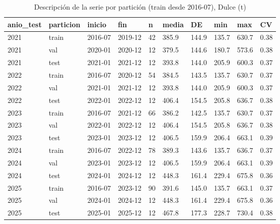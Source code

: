 \begin{table}[H]
\centering
\small
\caption{Descripción de la serie por partición (train desde 2016-07), Dulce (t)}
\label{tab:T03_particiones_dulce}
\begin{tabular}{llllllllll}
\toprule
anio\_test & particion & inicio & fin & n & media & DE & min & max & CV \\
\midrule
2021 & train & 2016-07 & 2019-12 & 42 & 385.9 & 144.9 & 135.7 & 630.7 & 0.38 \\
2021 & val & 2020-01 & 2020-12 & 12 & 379.5 & 144.6 & 180.7 & 573.6 & 0.38 \\
2021 & test & 2021-01 & 2021-12 & 12 & 393.8 & 144.0 & 205.9 & 600.3 & 0.37 \\
2022 & train & 2016-07 & 2020-12 & 54 & 384.5 & 143.5 & 135.7 & 630.7 & 0.37 \\
2022 & val & 2021-01 & 2021-12 & 12 & 393.8 & 144.0 & 205.9 & 600.3 & 0.37 \\
2022 & test & 2022-01 & 2022-12 & 12 & 406.4 & 154.5 & 205.8 & 636.7 & 0.38 \\
2023 & train & 2016-07 & 2021-12 & 66 & 386.2 & 142.5 & 135.7 & 630.7 & 0.37 \\
2023 & val & 2022-01 & 2022-12 & 12 & 406.4 & 154.5 & 205.8 & 636.7 & 0.38 \\
2023 & test & 2023-01 & 2023-12 & 12 & 406.5 & 159.9 & 206.4 & 663.1 & 0.39 \\
2024 & train & 2016-07 & 2022-12 & 78 & 389.3 & 143.6 & 135.7 & 636.7 & 0.37 \\
2024 & val & 2023-01 & 2023-12 & 12 & 406.5 & 159.9 & 206.4 & 663.1 & 0.39 \\
2024 & test & 2024-01 & 2024-12 & 12 & 448.3 & 161.4 & 229.4 & 675.8 & 0.36 \\
2025 & train & 2016-07 & 2023-12 & 90 & 391.6 & 145.0 & 135.7 & 663.1 & 0.37 \\
2025 & val & 2024-01 & 2024-12 & 12 & 448.3 & 161.4 & 229.4 & 675.8 & 0.36 \\
2025 & test & 2025-01 & 2025-12 & 12 & 467.8 & 177.3 & 228.7 & 730.4 & 0.38 \\
\bottomrule
\end{tabular}
\end{table}